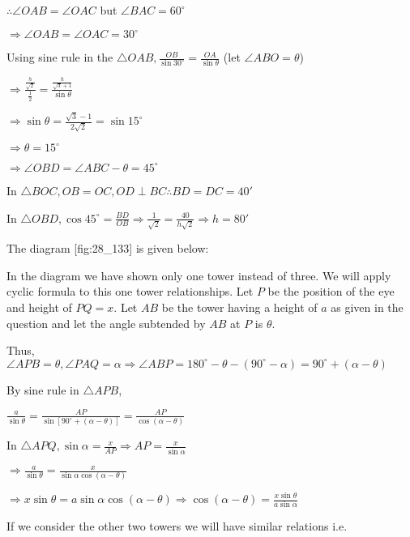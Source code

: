   $\therefore \angle OAB = \angle OAC$ but $\angle BAC = 60^\circ$

  $\Rightarrow \angle OAB = \angle OAC = 30^\circ$

  Using sine rule in the $\triangle OAB, \frac{OB}{\sin30^\circ} = \frac{OA}{\sin\theta}$ (let
  $\angle ABO = \theta$)

  $\Rightarrow \frac{\frac{h}{\sqrt{2}}}{\frac{1}{2}} = \frac{\frac{h}{\sqrt{3} + 1}}{\sin\theta}$

  $\Rightarrow \sin\theta = \frac{\sqrt{3} - 1}{2\sqrt{2}} = \sin15^\circ$

  $\Rightarrow \theta = 15^\circ$

  $\Rightarrow \angle OBD = \angle ABC - \theta = 45^\circ$

  In $\triangle BOC, OB=OC, OD\perp BC \therefore BD = DC = 40'$

  In $\triangle OBD, \cos45^\circ = \frac{BD}{OB} \Rightarrow \frac{1}{\sqrt{2}} =
  \frac{40}{h\sqrt{2}}\Rightarrow h = 80'$

\item The diagram [fig:28_133] is given below:

  \startplacefigure[reference=fig:28_133]
    \externalfigure[28_133.pdf]
  \stopplacefigure

  In the diagram we have shown only one tower instead of three. We will apply cyclic formula to this one
  tower relationships. Let $P$ be the position of the eye and height of $PQ = x$. Let
  $AB$ be the tower having a height of $a$ as given in the question and let the angle
  subtended by $AB$ at $P$ is $\theta$.

  Thus, $\angle APB = \theta, \angle PAQ = \alpha \Rightarrow \angle ABP = 180^\circ - \theta -
  (90^\circ - \alpha) = 90^\circ + (\alpha - \theta)$

  By sine rule in $\triangle APB$,

  $\frac{a}{\sin\theta} = \frac{AP}{\sin[90^\circ + (\alpha - \theta)]} = \frac{AP}{\cos(\alpha -
    \theta)}$

  In $\triangle APQ, \sin\alpha = \frac{x}{AP} \Rightarrow AP = \frac{x}{\sin\alpha}$

  $\Rightarrow \frac{a}{\sin\theta} = \frac{x}{\sin\alpha\cos(\alpha - \theta)}$

  $\Rightarrow x\sin\theta = a\sin\alpha\cos(\alpha - \theta)\Rightarrow \cos(\alpha - \theta) =
  \frac{x\sin\theta}{a\sin\alpha}$

  If we consider the other two towers we will have similar relations i.e.

